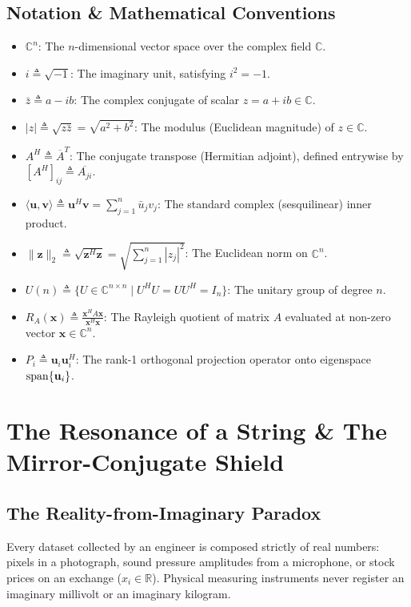 \subsection{Notation \& Mathematical Conventions}
\begin{itemize}
    \item $\mathbb{C}^n$: The $n$-dimensional vector space over the complex field $\mathbb{C}$.
    \item $i \triangleq \sqrt{-1}$: The imaginary unit, satisfying $i^2 = -1$.
    \item $\bar{z} \triangleq a - ib$: The complex conjugate of scalar $z = a + ib \in \mathbb{C}$.
    \item $|z| \triangleq \sqrt{z\bar{z}} = \sqrt{a^2 + b^2}$: The modulus (Euclidean magnitude) of $z \in \mathbb{C}$.
    \item $A^H \triangleq \overline{A}^T$: The conjugate transpose (Hermitian adjoint), defined entrywise by $[A^H]_{ij} \triangleq \overline{A_{ji}}$.
    \item $\langle \mathbf{u}, \mathbf{v} \rangle \triangleq \mathbf{u}^H \mathbf{v} = \sum_{j=1}^n \bar{u}_j v_j$: The standard complex (sesquilinear) inner product.
    \item $\|\mathbf{z}\|_2 \triangleq \sqrt{\mathbf{z}^H \mathbf{z}} = \sqrt{\sum_{j=1}^n |z_j|^2}$: The Euclidean norm on $\mathbb{C}^n$.
    \item $U(n) \triangleq \{U \in \mathbb{C}^{n \times n} \mid U^H U = U U^H = I_n\}$: The unitary group of degree $n$.
    \item $R_A(\mathbf{x}) \triangleq \frac{\mathbf{x}^H A \mathbf{x}}{\mathbf{x}^H \mathbf{x}}$: The Rayleigh quotient of matrix $A$ evaluated at non-zero vector $\mathbf{x} \in \mathbb{C}^n$.
    \item $P_i \triangleq \mathbf{u}_i \mathbf{u}_i^H$: The rank-1 orthogonal projection operator onto eigenspace $\operatorname{span}\{\mathbf{u}_i\}$.
\end{itemize}

\section{The Resonance of a String \& The Mirror-Conjugate Shield}

\subsection{The Reality-from-Imaginary Paradox}
Every dataset collected by an engineer is composed strictly of real numbers: pixels in a photograph, sound pressure amplitudes from a microphone, or stock prices on an exchange ($x_i \in \mathbb{R}$). Physical measuring instruments never register an imaginary millivolt or an imaginary kilogram.

